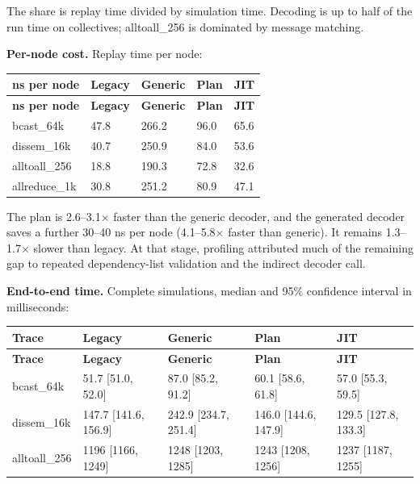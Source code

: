 \documentclass[10pt,a4paper]{article}
\begin{document}
The share is replay time divided by simulation time. Decoding is up to half of the run time on collectives; alltoall\_256 is dominated by message matching.

\textbf{Per-node cost.} Replay time per node:

{\small
\begin{longtable}{P{0.28\dimexpr{}\tabcolsep\relax}P{0.18\dimexpr{}\tabcolsep\relax}P{0.18\dimexpr{}\tabcolsep\relax}P{0.18\dimexpr{}\tabcolsep\relax}P{0.18\dimexpr{}\tabcolsep\relax}}
\toprule
\textbf{ns per node} & \textbf{Legacy} & \textbf{Generic} & \textbf{Plan} & \textbf{JIT} \\
\midrule
\endfirsthead
\toprule
\textbf{ns per node} & \textbf{Legacy} & \textbf{Generic} & \textbf{Plan} & \textbf{JIT} \\
\midrule
\endhead
\bottomrule
\endfoot
bcast\_64k & 47.8 & 266.2 & 96.0 & 65.6 \\
dissem\_16k & 40.7 & 250.9 & 84.0 & 53.6 \\
alltoall\_256 & 18.8 & 190.3 & 72.8 & 32.6 \\
allreduce\_1k & 30.8 & 251.2 & 80.9 & 47.1 \\
\end{longtable}
}

The plan is 2.6--3.1\(\times\) faster than the generic decoder, and the generated decoder saves a further 30--40 ns per node (4.1--5.8\(\times\) faster than generic). It remains 1.3--1.7\(\times\) slower than legacy. At that stage, profiling attributed much of the remaining gap to repeated dependency-list validation and the indirect decoder call.

\textbf{End-to-end time.} Complete simulations, median and 95\% confidence interval in milliseconds:

{\small
\begin{longtable}{P{0.2\dimexpr{}\tabcolsep\relax}P{0.2\dimexpr{}\tabcolsep\relax}P{0.2\dimexpr{}\tabcolsep\relax}P{0.2\dimexpr{}\tabcolsep\relax}P{0.2\dimexpr{}\tabcolsep\relax}}
\toprule
\textbf{Trace} & \textbf{Legacy} & \textbf{Generic} & \textbf{Plan} & \textbf{JIT} \\
\midrule
\endfirsthead
\toprule
\textbf{Trace} & \textbf{Legacy} & \textbf{Generic} & \textbf{Plan} & \textbf{JIT} \\
\midrule
\endhead
\bottomrule
\endfoot
bcast\_64k & 51.7 [51.0, 52.0] & 87.0 [85.2, 91.2] & 60.1 [58.6, 61.8] & 57.0 [55.3, 59.5] \\
dissem\_16k & 147.7 [141.6, 156.9] & 242.9 [234.7, 251.4] & 146.0 [144.6, 147.9] & 129.5 [127.8, 133.3] \\
alltoall\_256 & 1196 [1166, 1249] & 1248 [1203, 1285] & 1243 [1208, 1256] & 1237 [1187, 1255] \\
\end{longtable}
}
\end{document}

